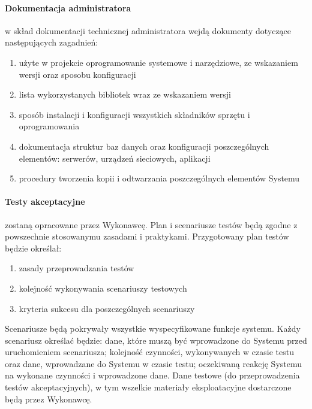 \documentclass{article}
\begin{document}
\paragraph{Dokumentacja administratora}  w skład dokumentacji technicznej administratora wejdą dokumenty dotyczące następujących zagadnień:
\begin{enumerate}
	\item użyte w projekcie oprogramowanie systemowe i narzędziowe, ze wskazaniem wersji oraz sposobu konfiguracji
	\item lista wykorzystanych bibliotek wraz ze wskazaniem wersji
	\item sposób instalacji i konfiguracji wszystkich składników sprzętu i oprogramowania
	\item dokumentacja struktur baz danych oraz konfiguracji poszczególnych elementów: serwerów, urządzeń sieciowych, aplikacji
	\item procedury tworzenia kopii i odtwarzania poszczególnych elementów Systemu
\end{enumerate}
\paragraph{Testy akceptacyjne} zostaną opracowane przez Wykonawcę. Plan i scenariusze testów będą zgodne z powszechnie stosowanymu zasadami i praktykami. Przygotowany plan testów będzie określał:
\begin{enumerate}
	\item zasady przeprowadzania testów
	\item kolejność wykonywania scenariuszy testowych
	\item kryteria sukcesu dla poszczególnych scenariuszy
\end{enumerate}
Scenariusze będą pokrywały wszystkie wyspecyfikowane funkcje systemu. Każdy scenariusz określać będzie: dane, które muszą być wprowadzone do Systemu przed uruchomieniem scenariusza; kolejność czynności, wykonywanych w czasie testu oraz dane, wprowadzane do Systemu w czasie testu; oczekiwaną reakcję Systemu na wykonane czynności i wprowadzone dane. Dane testowe (do przeprowadzenia testów akceptacyjnych), w tym wszelkie materiały eksploatacyjne dostarczone będą przez Wykonawcę.
\end{document}
